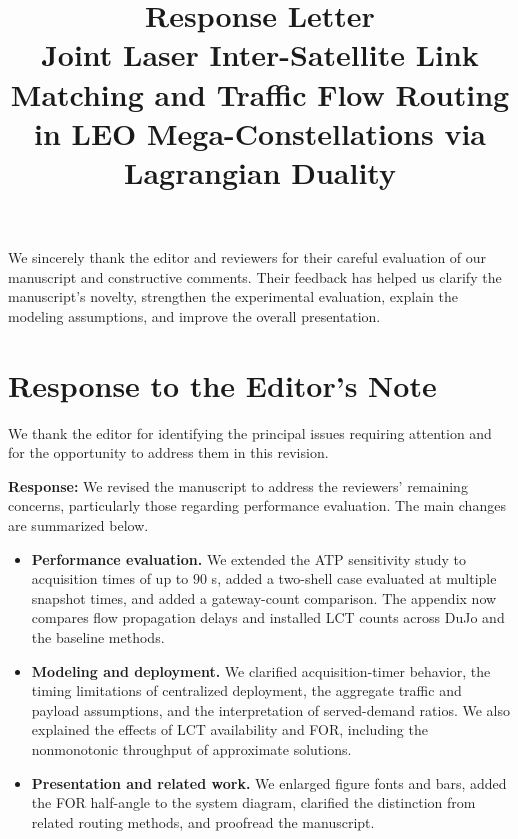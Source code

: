 \documentclass[journal,12pt,onecolumn,draftclsnofoot,]{IEEEtran}
\title{\Large\textbf{Response Letter}\\
{\Large Joint Laser Inter-Satellite Link Matching and Traffic Flow Routing in LEO Mega-Constellations via Lagrangian Duality}}
\author{
\IEEEauthorblockN{Zhouyou Gu, Jinho Choi, and Jihong Park}
}
\begin{document}
\maketitle

We sincerely thank the editor and reviewers for their careful evaluation of our manuscript and constructive comments. Their feedback has helped us clarify the manuscript's novelty, strengthen the experimental evaluation, explain the modeling assumptions, and improve the overall presentation.

\section*{\centering\Large\textbf{Response to the Editor's Note}}

We thank the editor for identifying the principal issues requiring attention and for the opportunity to address them in this revision.


\textbf{Response:} We revised the manuscript to address the reviewers' remaining concerns, particularly those regarding performance evaluation. The main changes are summarized below.

\begin{itemize}
  \item \textbf{Performance evaluation.} We extended the ATP sensitivity study to acquisition times of up to $90$ s, added a two-shell case evaluated at multiple snapshot times, and added a gateway-count comparison. The appendix now compares flow propagation delays and installed LCT counts across DuJo and the baseline methods.
  \item \textbf{Modeling and deployment.} We clarified acquisition-timer behavior, the timing limitations of centralized deployment, the aggregate traffic and payload assumptions, and the interpretation of served-demand ratios. We also explained the effects of LCT availability and FOR, including the nonmonotonic throughput of approximate solutions.
  \item \textbf{Presentation and related work.} We enlarged figure fonts and bars, added the FOR half-angle to the system diagram, clarified the distinction from related routing methods, and proofread the manuscript.
\end{itemize}
\end{document}

